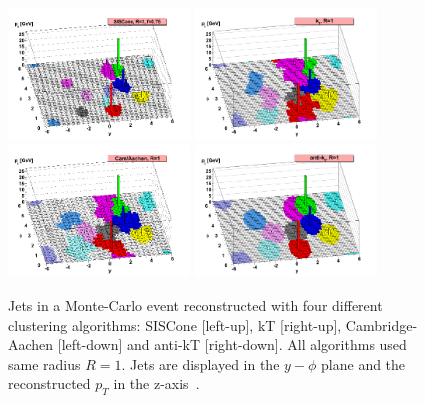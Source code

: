 \begin{figure}[!Hhtbp]
  \begin{center}
    \includegraphics[width=0.43\textwidth]{figs/herwig-parton-level-ev-siscone-R1-0-f0-75-ghosted4root.png}
    \includegraphics[width=0.43\textwidth]{figs/herwig-parton-level-ev-kt-R1-0-ghosted4root.png}
    \includegraphics[width=0.43\textwidth]{figs/herwig-parton-level-ev-cam-R1-0-ghosted4root.png}
    \includegraphics[width=0.43\textwidth]{figs/herwig-parton-level-ev-antikt-R1-0-ghosted4root.png}
    \caption{Jets in a Monte-Carlo event reconstructed with four different clustering algorithms: SISCone [left-up], kT [right-up], Cambridge-Aachen [left-down] and anti-kT [right-down]. All algorithms used same radius $R=1$. Jets are displayed in the $y-\phi$ plane and the reconstructed $p_{T}$ in the z-axis~\cite{Cacciari:2008gp}.}
    \label{fig:JetsAlgos}
  \end{center}
\end{figure}

